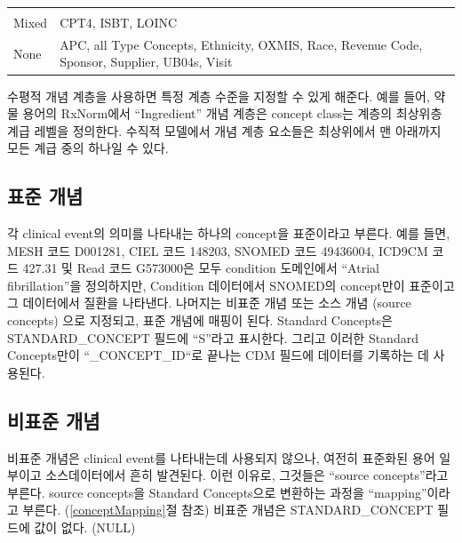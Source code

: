 \documentclass[11pt]{book}
\theoremstyle{definition}
\theoremstyle{definition}
\theoremstyle{definition}
\theoremstyle{remark}
\begin{document}
\begin{longtable}[]{@{}ll@{}}
\begin{minipage}[t]{0.47\columnwidth}
\end{minipage}\tabularnewline
\begin{minipage}[t]{0.13\columnwidth}\raggedright\strut
Mixed\strut
\end{minipage} & \begin{minipage}[t]{0.47\columnwidth}\raggedright\strut
CPT4, ISBT, LOINC\strut
\end{minipage}\tabularnewline
\begin{minipage}[t]{0.13\columnwidth}\raggedright\strut
None\strut
\end{minipage} & \begin{minipage}[t]{0.47\columnwidth}\raggedright\strut
APC, all Type Concepts, Ethnicity, OXMIS, Race, Revenue Code, Sponsor,
Supplier, UB04s, Visit\strut
\end{minipage}\tabularnewline
\bottomrule
\end{longtable}

수평적 개념 계층을 사용하면 특정 계층 수준을 지정할 수 있게 해준다. 예를
들어, 약물 용어의 RxNorm에서 ``Ingredient'' 개념 계층은 concept class는
계층의 최상위층 계급 레벨을 정의한다. 수직적 모델에서 개념 계층 요소들은
최상위에서 맨 아래까지 모든 계급 중의 하나일 수 있다.

\subsection{표준 개념}\label{standardConcepts}

각 clinical event의 의미를 나타내는 하나의 concept을 표준이라고 부른다.
예를 들면, MESH 코드 D001281, CIEL 코드 148203, SNOMED 코드 49436004,
ICD9CM 코드 427.31 및 Read 코드 G573000은 모두 condition 도메인에서
``Atrial fibrillation''을 정의하지만, Condition 데이터에서 SNOMED의
concept만이 표준이고 그 데이터에서 질환을 나타낸다. 나머지는 비표준 개념
또는 소스 개념 (source concepts) 으로 지정되고, 표준 개념에 매핑이 된다.
Standard Concepts은 STANDARD\_CONCEPT 필드에 ``S''라고 표시한다. 그리고
이러한 Standard Concepts만이 ``\_CONCEPT\_ID``로 끝나는 CDM 필드에
데이터를 기록하는 데 사용된다. 

\subsection{비표준 개념}\label{-}

비표준 개념은 clinical event를 나타내는데 사용되지 않으나, 여전히
표준화된 용어 일부이고 소스데이터에서 흔히 발견된다. 이런 이유로,
그것들은 ``source concepts''라고 부른다. source concepts을 Standard
Concepts으로 변환하는 과정을 ``mapping''이라고 부른다.
(\ref{conceptMapping}절 참조) 비표준 개념은 STANDARD\_CONCEPT 필드에
값이 없다. (NULL)
\end{document}
